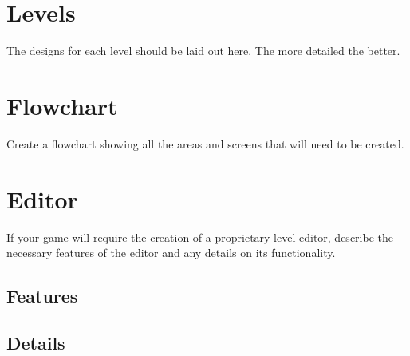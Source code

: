 \section{Levels} %
The designs for each level should be laid out here. The more detailed the better.

\section{Flowchart} %
Create a flowchart showing all the areas and screens that will need to be created.

\section{Editor} %
If your game will require the creation of a proprietary level editor, describe the necessary features of the editor and any details on its functionality.
\subsection{Features}%
\subsection{Details}%


